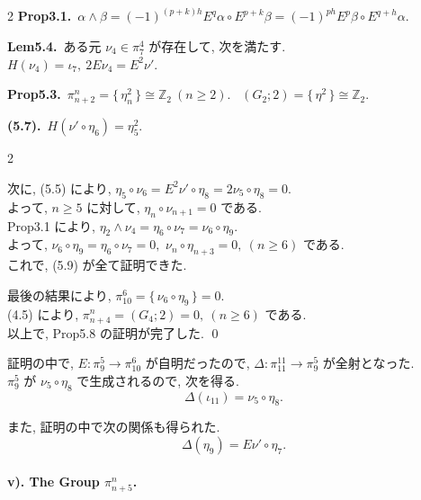 \documentclass[10pt, leqno]{ltjsarticle}
\newcommand{\gen}[1]{\{\,#1\,\}}       %
\numberwithin{equation}{section}
\theoremstyle{plain}
\theoremstyle{definition}
\theoremstyle{remark}
\begin{document}
\begin{paracol}{2}
\noindent
\textbf{Prop3.1.}\
\(
\alpha \wedge \beta
= (-1)^{(p+k)h} E^{q}\alpha \circ E^{p+k}\beta
= (-1)^{ph} E^{p}\beta \circ E^{q+h}\alpha .
\)

\noindent
\textbf{Lem5.4.}\
ある元 \(\nu_{4}\in \pi^{4}_{7}\) が存在して, 次を満たす. \\
\(H(\nu_{4})=\iota_7,\ 2E \nu_{4}=E^{2}\nu' .\)

\noindent
\textbf{Prop5.3.}\
\(\pi^{n}_{n+2}=\gen{\eta_n^{2}}\cong \mathbb Z_2\ (n\ge2).\) \
\((G_2;2)=\gen{\eta^{2}}\cong \mathbb Z_2 .\)

\noindent
\textbf{(5.7).}\
\(H(\nu'\circ\eta_6)=\eta_5^2 .\)




\end{paracol}

\begin{paracol}{2}

次に, (5.5) により,
\(\eta_5\circ\nu_6=E^2\nu'\circ\eta_8=2\nu_5\circ\eta_8=0 .\)\\
よって, \(n\geq5\) に対して, \(\eta_n\circ\nu_{n+1}=0\) である.\\ 
Prop3.1 により, \(\eta_2\wedge\nu_4=\eta_6\circ\nu_7=\nu_6\circ\eta_9 .\)\\
よって, \(\nu_6\circ\eta_9=\eta_6\circ\nu_7=0, \)
\(\nu_n\circ\eta_{n+3}=0,\ (n\geq6)\) である. \\
これで, (5.9) が全て証明できた. 

最後の結果により, \(\pi_{10}^6=\gen{\nu_6\circ\eta_9}=0 .\)\\
(4.5) により, \(\pi_{n+4}^n=(G_4;2)=0, \ (n\geq6)\) である. \\
以上で, Prop5.8 の証明が完了した. 
\qed

証明の中で, \(E:\pi_9^5\to\pi_{10}^6\) が自明だったので, 
\(\Delta:\pi_{11}^{11}\to\pi_9^5\) が全射となった. \\
\(\pi_9^5\) が \(\nu_5\circ\eta_8\) で生成されるので, 次を得る. 
\begin{equation}\label{eq:5.10}
\Delta(\iota_{11})=\nu_5\circ\eta_8 .
\end{equation}

また, 証明の中で次の関係も得られた. 
\begin{equation}\label{eq:5.11}
\Delta(\eta_9)=E\nu'\circ\eta_7 .
\end{equation}

\paragraph*{v). The Group \(\pi^{n}_{n+5}\).}


\end{paracol}
\end{document}

